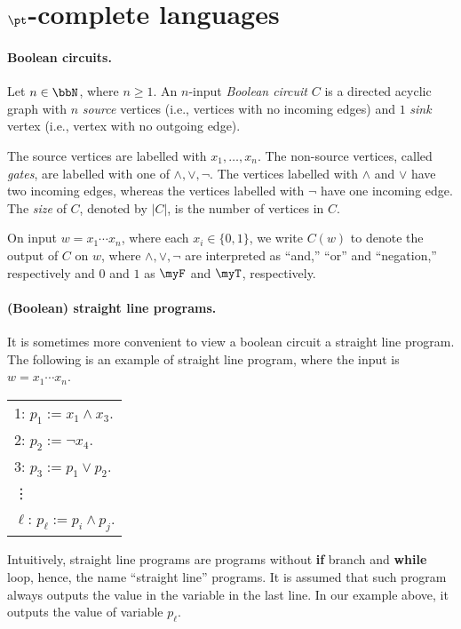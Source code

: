 \documentclass[11pt, a4paper]{article}
\begin{document}
\section{$\pt$-complete languages}

\paragraph*{Boolean circuits.}
Let $n\in \bbN$, where $n\geq 1$.
An $n$-input {\em Boolean circuit} $C$ is a directed acyclic graph with
$n$ {\em source} vertices (i.e., vertices with no incoming edges) and 
$1$ {\em sink} vertex (i.e., vertex with no outgoing edge).

The source vertices are labelled with $x_1,\ldots,x_n$.
The non-source vertices, called {\em gates},
are labelled with one of $\wedge, \vee,\neg$.
The vertices labelled with $\wedge$ and $\vee$ have two incoming edges,
whereas the vertices labelled with $\neg$ have one incoming edge.
The {\em size} of $C$, denoted by $|C|$, is the number of vertices in $C$.

On input $w = x_1\cdots x_n$, where each $x_i \in \{0,1\}$,
we write $C(w)$ to denote the output of $C$ on $w$,
where $\wedge,\vee,\neg$ are interpreted as ``and,'' ``or'' and ``negation,'' respectively
and $0$ and $1$ as $\myF$ and $\myT$, respectively.


\paragraph*{(Boolean) straight line programs.}
It is sometimes more convenient to view a boolean circuit a straight line program.
The following is an example of straight line program,
where the input is $w=x_1\cdots x_n$.
\begin{center}
\begin{tabular}{l}
{\footnotesize 1:}\; $p_1 := x_1 \wedge x_3$.
\\
{\footnotesize 2:}\; $p_2 := \neg x_4$.
\\
{\footnotesize 3:}\; $p_3 := p_1 \vee p_2$.
\\
\vdots
\\
{\footnotesize $\ell$:}\; $p_{\ell} := p_{i} \wedge p_{j}$.
\end{tabular}
\end{center}
Intuitively, straight line programs are programs without {\bf if} branch and {\bf while} loop,
hence, the name ``straight line'' programs.
It is assumed that such program always outputs the value in the variable in the last line.
In our example above, it outputs the value of variable $p_{\ell}$.
\end{document}
